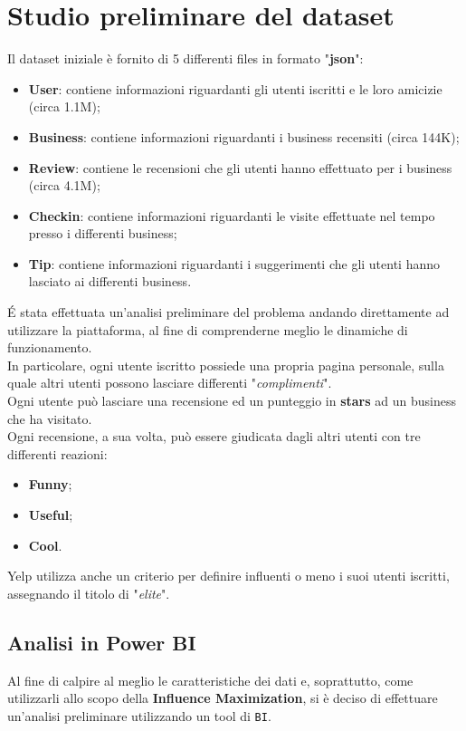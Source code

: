 
\chapter{Studio preliminare del dataset}
Il dataset iniziale è fornito di 5 differenti files in formato "\textbf{json}":
\begin{itemize}
	\item \textbf{User}: contiene informazioni riguardanti gli utenti iscritti e le loro amicizie (circa 1.1M);
	\item \textbf{Business}: contiene informazioni riguardanti i business recensiti (circa 144K);
	\item \textbf{Review}: contiene le recensioni che gli utenti hanno effettuato per i business (circa 4.1M);
	\item \textbf{Checkin}: contiene informazioni riguardanti le visite effettuate nel tempo presso i differenti business;
	\item \textbf{Tip}: contiene informazioni riguardanti i suggerimenti che gli utenti hanno lasciato ai differenti business.
\end{itemize}

\'E stata effettuata un'analisi preliminare del problema andando direttamente ad
utilizzare la piattaforma, al fine di comprenderne meglio le dinamiche di
funzionamento.\\
In particolare, ogni utente iscritto possiede una propria
pagina personale, sulla quale altri utenti possono lasciare differenti
"\textit{complimenti}".\\
Ogni utente può lasciare una recensione ed un punteggio in
\textbf{stars} ad un business che ha visitato.\\
Ogni recensione, a sua volta, può essere giudicata dagli altri utenti con tre
differenti reazioni:
\begin{itemize}
	\item \textbf{Funny};
	\item \textbf{Useful};
	\item \textbf{Cool}.
\end{itemize}
Yelp utilizza anche un criterio per definire influenti o meno i suoi utenti iscritti,
assegnando il titolo di "\textit{elite}".\\

\section{Analisi in Power BI}
Al fine di calpire al meglio le caratteristiche dei dati e, soprattutto, come
utilizzarli allo scopo della \textbf{Influence Maximization}, si è deciso di
effettuare un'analisi preliminare utilizzando un tool di \texttt{BI}.\\

